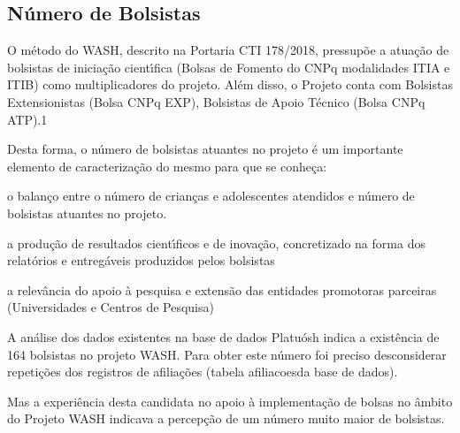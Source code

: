 \documentclass[
12pt,		%
openright,	%
twoside,  %
a4paper,			%
chapter=TITLE,		%
english,			%
french,				%
spanish,			%
brazil				%
]{USPSC-classe/USPSC}
\begin{document}
\subsection[N\'umero de Bolsistas]{N\'umero de Bolsistas}\label{N\'umero de Bolsistas}
O m\'etodo do WASH, descrito na Portaria CTI 178/2018, pressup\~oe a atua\c{c}\~ao de bolsistas de inicia\c{c}\~ao cient\'{\i}fica (Bolsas de Fomento do CNPq modalidades ITIA e ITIB) como multiplicadores do projeto. Al\'em disso, o Projeto conta com Bolsistas Extensionistas (Bolsa CNPq EXP), Bolsistas de Apoio T\'ecnico (Bolsa CNPq ATP).1










Desta forma, o n\'umero de bolsistas atuantes no projeto \'e um importante elemento de caracteriza\c{c}\~ao do mesmo para que se conhe\c{c}a:











\begin{alineas}
\item o balan\c{c}o entre o n\'umero de crian\c{c}as e adolescentes atendidos e n\'umero de  bolsistas atuantes no projeto.
\item a produ\c{c}\~ao de resultados cient\'{\i}ficos e de inova\c{c}\~ao, concretizado na forma dos relat\'orios  e entreg\'aveis produzidos pelos bolsistas
\item a relev\^ancia do apoio \`a pesquisa e extens\~ao das entidades promotoras parceiras (Universidades e Centros de Pesquisa)
\end{alineas}

A an\'alise dos dados existentes na base de dados Platu\'osh indica a exist\^encia de 164 bolsistas no projeto WASH. Para obter este n\'umero foi preciso desconsiderar repeti\c{c}\~oes dos registros de afilia\c{c}\~oes (tabela \textquotedbl afiliacoes\textquotedbl  da base de dados).










Mas a experi\^encia desta candidata no apoio \`a implementa\c{c}\~ao de bolsas no \^ambito do Projeto WASH indicava a percep\c{c}\~ao de um n\'umero muito maior de bolsistas.
\end{document}
